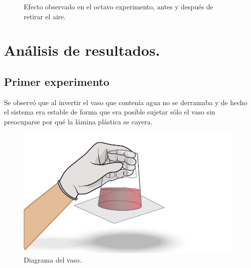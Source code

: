 \documentclass[10pt,a4paper]{article}
\begin{document}
\begin{figure}[H]%
    \centering
    \qquad
    \caption{Efecto observado en el octavo experimento, antes y después de retirar el aire.}%
    \label{fig:example}%
\end{figure}

\newpage
\section{Análisis de resultados.}
\subsection*{Primer experimento}
Se observó que al invertir el vaso que contenía agua no se derramaba y de hecho el sistema era estable de forma que era posible sujetar sólo el vaso sin preocuparse por qué la lámina plástica se cayera. 

\begin{figure}[H]
\includegraphics[scale=0.3]{vvaso.jpg}
\centering
\caption{Diagrama del vaso.}
\end{figure}
\end{document}
